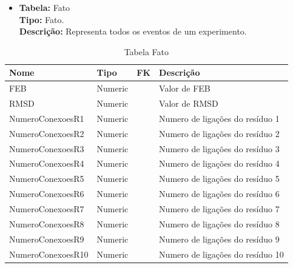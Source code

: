 
\newpage

\begin{itemize}
	\item
		\textbf{Tabela:} Fato \\
		\textbf{Tipo:} Fato. \\
		\textbf{Descrição:} Representa todos os eventos de um experimento.
\end{itemize}
\begin{table}[!htbp]
	\caption{Tabela Fato}
	\centering
	\begin{tabular}{@{}llll@{}}
	\toprule
	\textbf{Nome} & \textbf{Tipo} & \textbf{FK} & \textbf{Descrição}           				\\ \midrule
	FEB            			 & Numeric        &             & Valor de FEB			    \\
	RMSD    				 & Numeric        &             & Valor de RMSD          		\\
	NumeroConexoesR1 	     & Numeric        &             & Numero de ligações do resíduo 1   \\
	NumeroConexoesR2 	     & Numeric        &             & Numero de ligações do resíduo 2   \\
	NumeroConexoesR3 	     & Numeric        &             & Numero de ligações do resíduo 3   \\
	NumeroConexoesR4 	     & Numeric        &             & Numero de ligações do resíduo 4   \\
	NumeroConexoesR5 	     & Numeric        &             & Numero de ligações do resíduo 5   \\
	NumeroConexoesR6 	     & Numeric        &             & Numero de ligações do resíduo 6   \\
	NumeroConexoesR7 	     & Numeric        &             & Numero de ligações do resíduo 7   \\
	NumeroConexoesR8 	     & Numeric        &             & Numero de ligações do resíduo 8   \\
	NumeroConexoesR9 	     & Numeric        &             & Numero de ligações do resíduo 9   \\
	NumeroConexoesR10 	     & Numeric        &             & Numero de ligações do resíduo 10  \\

\end{tabular}
\end{table}
